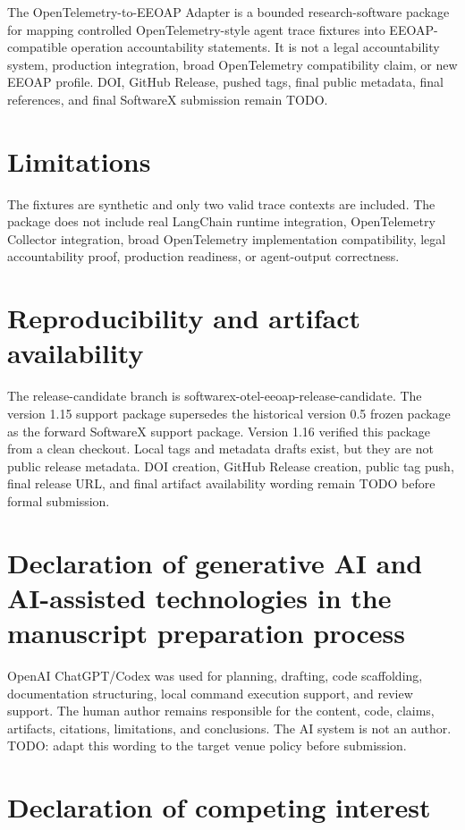 \documentclass[preprint,12pt,a4paper]{elsarticle}
\begin{document}
The OpenTelemetry-to-EEOAP Adapter is a bounded research-software package for
mapping controlled OpenTelemetry-style agent trace fixtures into
EEOAP-compatible operation accountability statements. It is not a legal
accountability system, production integration, broad OpenTelemetry compatibility
claim, or new EEOAP profile. DOI, GitHub Release, pushed tags, final public
metadata, final references, and final SoftwareX submission remain TODO.

\section*{Limitations}

The fixtures are synthetic and only two valid trace contexts are included. The
package does not include real LangChain runtime integration, OpenTelemetry
Collector integration, broad OpenTelemetry implementation compatibility, legal
accountability proof, production readiness, or agent-output correctness.

\section*{Reproducibility and artifact availability}

The release-candidate branch is softwarex-otel-eeoap-release-candidate. The
version 1.15 support package supersedes the historical version 0.5 frozen
package as the forward SoftwareX support package. Version 1.16 verified this
package from a clean checkout. Local tags and metadata drafts exist, but they
are not public release metadata. DOI creation, GitHub Release creation, public
tag push, final release URL, and final artifact availability wording remain
TODO before formal submission.

\section*{Declaration of generative AI and AI-assisted technologies in the manuscript preparation process}

OpenAI ChatGPT/Codex was used for planning, drafting, code scaffolding,
documentation structuring, local command execution support, and review support.
The human author remains responsible for the content, code, claims, artifacts,
citations, limitations, and conclusions. The AI system is not an author. TODO:
adapt this wording to the target venue policy before submission.

\section*{Declaration of competing interest}
\end{document}
